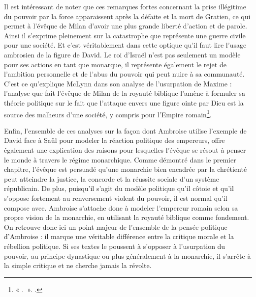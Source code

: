 \bigskip

Il est intéressant de noter que ces remarques fortes concernant la prise illégitime du pouvoir par la force apparaissent après la défaite et la mort de Gratien, ce qui permet à l'évêque de Milan d'avoir une plus grande liberté d'action et de parole. Ainsi il s'exprime pleinement sur la catastrophe que représente une guerre civile pour une société. Et c'est véritablement dans cette optique qu'il faut lire l'usage ambrosien de la figure de David. Le roi d'Israël n'est pas seulement un modèle pour ses actions en tant que monarque, il représente également le rejet de l'ambition personnelle et de l'abus du pouvoir qui peut nuire à sa communauté. C'est ce qu'explique McLynn dans son analyse de l'usurpation de Maxime : l'analyse que fait l'évêque de Milan de la royauté biblique l'amène à formuler sa théorie politique sur le fait que l'attaque envers une figure ointe par Dieu est la source des malheurs d'une société, y compris pour l'Empire romain\footnote{« .~». \cite[155]{mclynn_ambrose}.}.

\bigskip

Enfin, l'ensemble de ces analyses sur la façon dont Ambroise utilise l'exemple de David face à Saül pour modeler la réaction politique des empereurs, offre également une explication des raisons pour lesquelles l'évêque se résout à penser le monde à travers le régime monarchique. Comme démontré dans le premier chapitre, l'évêque est persuadé qu'une monarchie bien encadrée par la chrétienté peut atteindre la justice, la concorde et la réussite sociale d'un système républicain. De plus, puisqu'il s'agit du modèle politique qu'il côtoie et qu'il s'oppose fortement au renversement violent du pouvoir, il est normal qu'il compose avec. Ambroise s'attache donc à modeler l'empereur romain selon sa propre vision de la monarchie, en utilisant la royauté biblique comme fondement. On retrouve donc ici un point majeur de l'ensemble de la pensée politique d'Ambroise : il marque une véritable différence entre la critique morale et la rébellion politique. Si ses textes le poussent à s’opposer à l’usurpation du pouvoir, au principe dynastique ou plus généralement à la monarchie, il s’arrête à la simple critique et ne cherche jamais la révolte.

\bigskip

